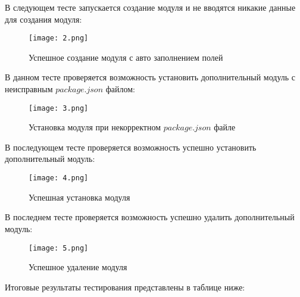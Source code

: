 \documentclass[12pt]{article}
\begin{document}
    В следующем тесте запускается создание модуля и не вводятся никакие данные для создания модуля:
    \begin{figure}[h]
        \texttt{[image: 2.png]}
        \centering
        \caption{Успешное   создание  модуля с авто заполнением  полей}
    \end{figure}

    \newpage

    В данном тесте проверяется возможность установить дополнительный модуль с неисправным $package.json$ файлом:
    \begin{figure}[h]
        \texttt{[image: 3.png]}
        \centering
        \caption{Установка модуля при некорректном $package.json$ файле}
    \end{figure}

    В последующем тесте проверяется возможность успешно установить дополнительный модуль:
    \begin{figure}[h]
        \texttt{[image: 4.png]}
        \centering
        \caption{Успешная установка модуля}
    \end{figure}

    \newpage
    В последнем тесте проверяется возможность успешно удалить дополнительный модуль:
    \begin{figure}[h]
        \texttt{[image: 5.png]}
        \centering
        \caption{Успешное удаление модуля}
    \end{figure}

    \newpage
    Итоговые результаты тестирования представлены в таблице ниже:
\end{document}
